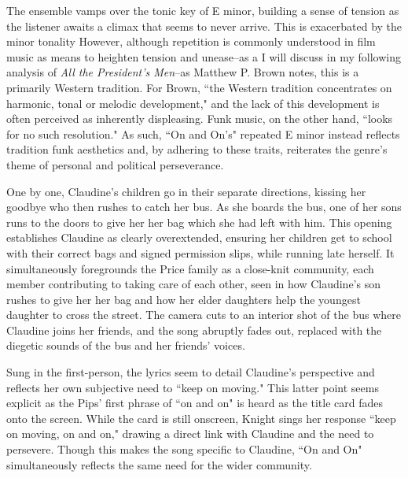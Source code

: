 The ensemble vamps over the tonic key of E minor, building a sense of tension as the listener awaits a climax that seems to never arrive.
This is exacerbated by the minor tonality
However, although repetition is commonly understood in film music as means to heighten tension and unease–as a I will discuss in my following analysis of \textit{All the President's Men}–as Matthew P. Brown notes, this is a primarily Western tradition.
For Brown, ``the Western tradition concentrates on harmonic, tonal or melodic development," and the lack of this development is often perceived as inherently displeasing.\autocite[][497]{brown_funk_1994}
Funk music, on the other hand, ``looks for no such resolution."\autocite[][498]{brown_funk_1994}
As such, ``On and On's" repeated E minor instead reflects tradition funk aesthetics and, by adhering to these traits, reiterates the genre's theme of personal and political perseverance.

One by one, Claudine's children go in their separate directions, kissing her goodbye who then rushes to catch her bus.
As she boards the bus, one of her sons runs to the doors to give her her bag which she had left with him.
This opening establishes Claudine as clearly overextended, ensuring her children get to school with their correct bags and signed permission slips, while running late herself.
It simultaneously foregrounds the Price family as a close-knit community, each member contributing to taking care of each other, seen in how Claudine's son rushes to give her her bag and how her elder daughters help the youngest daughter to cross the street.
The camera cuts to an interior shot of the bus where Claudine joins her friends, and the song abruptly fades out, replaced with the diegetic sounds of the bus and her friends' voices.

Sung in the first-person, the lyrics seem to detail Claudine's perspective and reflects her own subjective need to ``keep on moving."
This latter point seems explicit as the Pips' first phrase of ``on and on" is heard as the title card fades onto the screen.
While the card is still onscreen, Knight sings her response ``keep on moving, on and on," drawing a direct link with Claudine and the need to persevere.
Though this makes the song specific to Claudine, ``On and On" simultaneously reflects the same need for the wider community.

